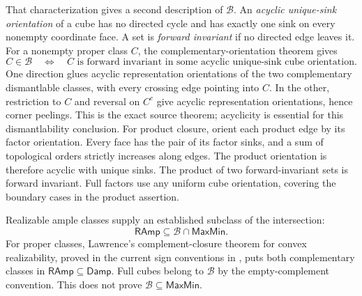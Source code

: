 \documentclass[11pt]{article}
\theoremstyle{definition}
\newcommand{\MaxMin}{\mathsf{MaxMin}}
\newcommand{\Damp}{\mathsf{Damp}}
\newcommand{\RAmp}{\mathsf{RAmp}}
\begin{document}
That characterization gives a second description of $\mathcal B$.
An \emph{acyclic unique-sink orientation} of a cube has no directed cycle
and has exactly one sink on every nonempty coordinate face. A set is
\emph{forward invariant} if no directed edge leaves it. For a nonempty
proper class $C$, the complementary-orientation theorem \cite{OrientationClasses} gives
\begin{equation}\label{eq:both-orientation}
 C\in\mathcal B\quad\Longleftrightarrow\quad
 C\text{ is forward invariant in some acyclic unique-sink cube orientation}.
\end{equation}
One direction glues acyclic representation orientations of the two
complementary dismantlable classes, with every crossing edge pointing into
$C$. In the other, restriction to $C$ and reversal on $C^c$ give acyclic
representation orientations, hence corner peelings. This is the exact
source theorem; acyclicity is essential for this dismantlability conclusion.
For product closure, orient each product edge by its factor orientation.
Every face has the pair of its factor sinks, and a sum of topological
orders strictly increases along edges. The product orientation is therefore
acyclic with unique sinks. The product of two forward-invariant sets is
forward invariant. Full factors use any uniform cube orientation, covering
the boundary cases in the product assertion.

Realizable ample classes supply an established subclass of the intersection:
\[
 \RAmp\subseteq\mathcal B\cap\MaxMin.
\]
For proper classes, Lawrence's complement-closure theorem for convex realizability,
proved in the current sign conventions in
\cite[Proposition~\textnormal{Complement closure of convex realizability}]{MaxParents},
puts both complementary classes in $\RAmp\subseteq\Damp$. Full cubes
belong to $\mathcal B$ by the empty-complement convention.
This does not prove $\mathcal B\subseteq\MaxMin$.
\end{document}
